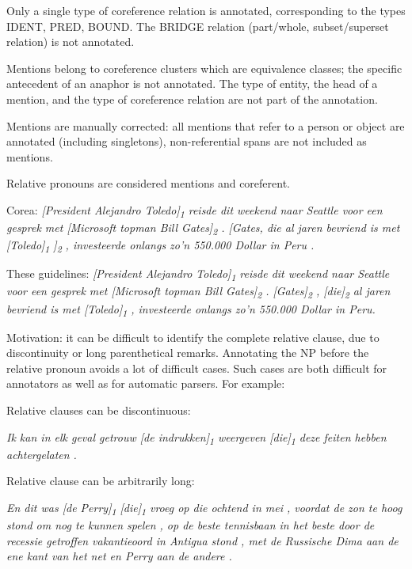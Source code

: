 \begin{itemize*}
\item Only a single type of coreference relation is annotated,
  corresponding to the types IDENT, PRED, BOUND. The BRIDGE relation
  (part/whole, subset/superset relation) is not annotated.
\item Mentions belong to coreference clusters which are equivalence
  classes; the specific antecedent of an anaphor is not annotated. The
  type of entity, the head of a mention, and the type of coreference
  relation are not part of the annotation.
\item Mentions are manually corrected: all mentions that refer to a person or object
  are annotated (including singletons), non-referential spans are not included as mentions.
\item Relative pronouns are considered mentions and coreferent.

  Corea: \emph{{[}President Alejandro Toledo{]}\textsubscript{1} reisde dit weekend naar
  Seattle voor een gesprek met {[}Microsoft topman Bill Gates{]}\textsubscript{2} .
  {[}Gates, die al jaren bevriend is met {[}Toledo{]}\textsubscript{1} {]}\textsubscript{2} ,
  investeerde onlangs zo'n 550.000 Dollar in Peru .}

  These guidelines: \emph{{[}President Alejandro Toledo{]}\textsubscript{1} reisde dit
  weekend naar Seattle voor een gesprek met {[}Microsoft topman Bill
  Gates{]}\textsubscript{2} . {[}Gates{]}\textsubscript{2} , {[}die{]}\textsubscript{2} al jaren bevriend is
  met {[}Toledo{]}\textsubscript{1} , investeerde onlangs zo'n 550.000 Dollar in
  Peru.}

  Motivation: it can be difficult to identify the complete relative
  clause, due to discontinuity or long parenthetical remarks. Annotating
  the NP before the relative pronoun avoids a lot of difficult cases.
  Such cases are both difficult for annotators as well as for automatic parsers.
  For example:

    \begin{itemize*}
    \item Relative clauses can be discontinuous:

      \emph{Ik kan in elk geval getrouw {[}de indrukken{]}\textsubscript{1} weergeven
      {[}die{]}\textsubscript{1} deze feiten hebben achtergelaten .}

    \item Relative clause can be arbitrarily long:

      \emph{En dit was {[}de Perry{]}\textsubscript{1} {[}die{]}\textsubscript{1} vroeg op die ochtend
      in mei , voordat de zon te hoog stond om nog te kunnen spelen , op de
      beste tennisbaan in het beste door de recessie getroffen vakantieoord
      in Antigua stond , met de Russische Dima aan de ene kant van het net
      en Perry aan de andere .}


\end{itemize*}
\end{itemize*}
